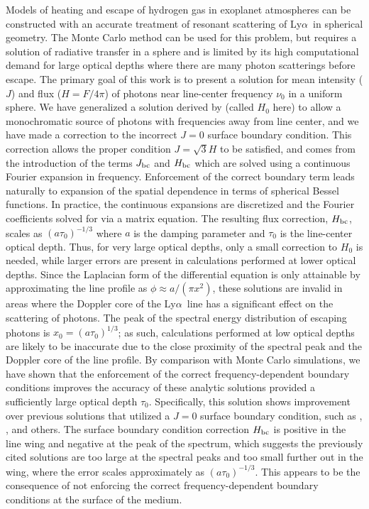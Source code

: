 \documentclass{aastex63}
\newcommand\lya{Ly$\alpha$\ }
\begin{document}
Models of heating and escape of hydrogen gas in exoplanet atmospheres can be constructed with an accurate treatment of resonant scattering of \lya in spherical geometry. The Monte Carlo method can be used for this problem, but requires a solution of radiative transfer in a sphere and is limited by its high computational demand for large optical depths where there are many photon scatterings before escape. The primary goal of this work is to present a solution for mean intensity ($J$) and flux ($H = F/4\pi$) of photons near line-center frequency $\nu_0$ in a uniform sphere. We have generalized a solution derived by \cite{2006ApJ...649...14D} (called $H_0$ here) to allow a monochromatic source of photons with frequencies away from line center, and we have made a correction to the incorrect $J=0$ surface boundary condition. This correction allows the proper condition $J=\sqrt{3}H$ to be satisfied, and comes from the introduction of the terms $J_{\rm bc}$ and $H_{\rm bc}$ which are solved using a continuous Fourier expansion in frequency. Enforcement of the correct boundary term leads naturally to expansion of the spatial dependence in terms of spherical Bessel functions. In practice, the continuous expansions are discretized and the Fourier coefficients solved for via a matrix equation. The resulting flux correction, $H_{\rm bc}$, scales as $(a\tau_0)^{-1/3}$ where $a$ is the damping parameter and $\tau_0$ is the line-center optical depth. Thus, for very large optical depths, only a small correction to $H_0$ is needed, while larger errors are present in calculations performed at lower optical depths. Since the Laplacian form of the differential equation is only attainable by approximating the line profile as $\phi \approx a/(\pi x^2)$, these solutions are invalid in areas where the Doppler core of the \lya line has a significant effect on the scattering of photons. The peak of the spectral energy distribution of escaping photons is $x_0 = (a\tau_0)^{1/3}$; as such, calculations performed at low optical depths are likely to be inaccurate due to the close proximity of the spectral peak and the Doppler core of the line profile. By comparison with Monte Carlo simulations, we have shown that the enforcement of the correct frequency-dependent boundary conditions improves the accuracy of these analytic solutions %
provided a sufficiently large optical depth $\tau_0$. Specifically, this solution shows improvement over previous solutions that utilized a $J=0$ surface boundary condition, such as \cite{1973MNRAS.162...43H}, \cite{1990ApJ...350..216N}, \cite{2006ApJ...649...14D} and others. The surface boundary condition correction $H_{\rm bc}$ is positive in the line wing and negative at the peak of the spectrum, which suggests the previously cited solutions are too large at the spectral peaks and too small further out in the wing, where the error scales approximately as $(a\tau_0)^{-1/3}$. This appears to be the consequence of not enforcing the correct frequency-dependent boundary conditions at the surface of the medium.
\end{document}
